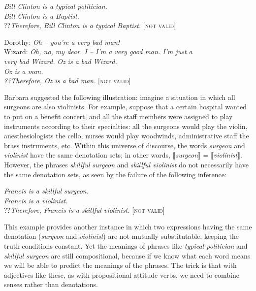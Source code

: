 \ea \label{ex:15.6}
\textit{Bill Clinton is a typical politician.}\\
\textit{Bill Clinton is a Baptist.}\\\FelixHRule
??\textit{Therefore, Bill Clinton is a typical Baptist.} \hfill  [\textsc{not valid}]
\z

\ea \label{ex:15.7}
\ea  Dorothy: \textit{Oh – you’re a very bad man!}\\
Wizard: \textit{Oh, no, my dear. I – I’m a very good man. I’m just a \\
\hspace{1.2cm} very bad Wizard.} 
\ex  
  \textit{Oz is a bad Wizard.}\\
\textit{Oz is a man.\\
\FelixHRule
??Therefore, Oz is a bad man.}  \hfill [\textsc{not valid}]
\z \z


Barbara \citet{Partee1995} suggested the following illustration: imagine a situation in which all surgeons are also violinists. For example, suppose that a certain hospital wanted to put on a benefit concert, and all the staff members were assigned to play instruments according to their specialties: all the surgeons would play the violin, anesthesiologists the cello, nurses would play woodwinds, administrative staff the brass instruments, etc. Within this universe of discourse, the words \textit{surgeon} and \textit{violinist} have the same denotation sets; in other words, $\llbracket$\textit{surgeon}$\rrbracket$  = $\llbracket$\textit{violinist}$\rrbracket$. However, the phrases \textit{skillful surgeon} and \textit{skillful violinist} do not necessarily have the same denotation sets, as seen by the failure of the following inference:


\ea \label{ex:15.8}
\textit{Francis is a skillful surgeon.}\\
\textit{Francis is a violinist.}\\
\FelixHRule
??\textit{Therefore, Francis is a skillful violinist.}  \hfill [\textsc{not valid}]
\z


This example provides another instance in which two expressions having the same denotation (\textit{surgeon} and \textit{violinist}) are not mutually substitutable, keeping the truth conditions constant. Yet the meanings of phrases like \textit{typical politician} and \textit{skillful surgeon} are still compositional, because if we know what each word means we will be able to predict the meanings of the phrases. The trick is that with adjectives like these, as with propositional attitude verbs, we need to combine senses rather than denotations.



